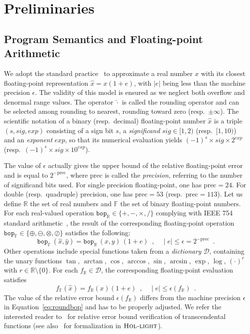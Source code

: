 \documentclass[preprint]{sigplanconf}
\newcommand{\setD}{\mathcal{D}} %
\newcommand{\R}{\mathbb{R}}
\newcommand{\F}{\mathbb{F}}
\renewcommand{\prec}{\text{prec}}
\newcommand{\hol}{\text{\sc Hol-light}}
\newcommand{\bop}{\mathtt{bop}}
\theoremstyle{plain}
\begin{document}
\section{Preliminaries}
\label{sec:background}

\subsection{Program Semantics and Floating-point Arithmetic}
\label{sec:fpbackground}
We adopt the standard practice~\cite{higham2002accuracy} to approximate a real number $x$ with its closest floating-point representation $\hat{x} = x (1 + e)$, with $|e|$ being less than the machine precision $\epsilon$. The validity of this model is ensured as we neglect both overflow and denormal range values.
The operator $\hat{\cdot}$ is called the rounding operator and can be selected among rounding to nearest, rounding toward zero (resp.~$\pm\infty$).
The scientific notation of a binary (resp.~decimal) floating-point number $\hat{x}$ is a triple $(s, sig, exp)$ consisting of a sign bit $s$, a {\em significand} $sig \in [1, 2)$ (resp.~$[1, 10)$) and an {\em exponent} $exp$, so that its numerical evaluation yields $(-1)^{s} \times sig \times 2^{exp}$ (resp.~$(-1)^{s} \times sig \times 10^{exp}$). 

The value of $\epsilon$ actually gives the upper bound of the relative floating-point error and is equal to $2^{-\prec}$, where $\prec$ is called the {\em precision}, referring to the number of significand bits used. For single precision floating-point, one has $\prec = 24$. For double (resp.~quadruple) precision, one has $\prec = 53$ (resp.~$\prec=113$). Let us define $\R$ the set of real numbers and $\F$ the set of binary floating-point numbers.
For each real-valued operation $\bop_\R \in \{+, -, \times, \slash \}$ complying with IEEE 754 standard arithmetic~\cite{IEEE}, the result of the corresponding floating-point operation $\bop_\F \in \{\oplus, \ominus, \otimes, \oslash \}$ satisfies the following:
\begin{equation}
\label{eq:roundbop}
\bop_\F \, (\hat{x}, \hat{y}) = \bop_\R \, (x, y) \, (1 + e) \enspace, \quad \mid e \mid \leq \epsilon = 2^{-\prec} \enspace.
\end{equation}
%
Other operations include special functions taken from a {\em dictionary} $\setD$, containing the unary functions
$\tan$, $\arctan$, $\cos$, $\arccos$, $\sin$, $\arcsin$, $\exp$, $\log$, $(\cdot)^{r}$ with $r\in \R\setminus\{0\}$. For each $f_\R \in \setD$, the corresponding floating-point evaluation satisfies 
\begin{equation}
\label{eq:roundtransc}
f_\F (\hat{x}) = f_\R (x) (1 + e) \enspace, \quad \mid e \mid \leq \epsilon (f_\R) \enspace.
\end{equation}
The value of the relative error bound $\epsilon (f_\R)$ differs from the machine precision $\epsilon$ in Equation~\eqref{eq:roundbop} and has to be properly adjusted. We refer the interested reader to~\cite{VerifCADTransc} for relative error bound verification of transcendental functions (see also~\cite{VerifHOLTransc} for formalization in $\hol$).
%
\end{document}
